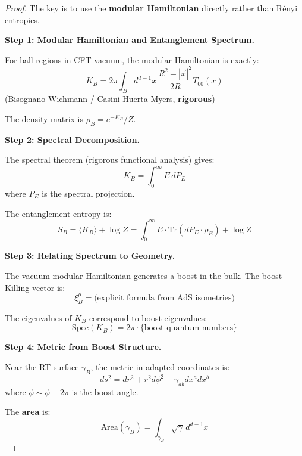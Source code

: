 \documentclass[12pt,a4paper]{article}
\begin{document}
\begin{proof}
The key is to use the \textbf{modular Hamiltonian} directly rather than R\'enyi entropies.

\textbf{Step 1: Modular Hamiltonian and Entanglement Spectrum.}

For ball regions in CFT vacuum, the modular Hamiltonian is exactly:
\begin{equation}
K_B = 2\pi \int_B d^{d-1}x \, \frac{R^2 - |\vec{x}|^2}{2R} T_{00}(x)
\end{equation}
(Bisognano-Wichmann / Casini-Huerta-Myers, \textbf{rigorous})

The density matrix is $\rho_B = e^{-K_B}/Z$.

\textbf{Step 2: Spectral Decomposition.}

The spectral theorem (rigorous functional analysis) gives:
\begin{equation}
K_B = \int_0^\infty E \, dP_E
\end{equation}
where $P_E$ is the spectral projection.

The entanglement entropy is:
\begin{equation}
S_B = \langle K_B \rangle + \log Z = \int_0^\infty E \cdot \text{Tr}(dP_E \cdot \rho_B) + \log Z
\end{equation}

\textbf{Step 3: Relating Spectrum to Geometry.}

The vacuum modular Hamiltonian generates a boost in the bulk. The boost Killing vector is:
\begin{equation}
\xi^\mu_B = \text{(explicit formula from AdS isometries)}
\end{equation}

The eigenvalues of $K_B$ correspond to boost eigenvalues:
\begin{equation}
\text{Spec}(K_B) = 2\pi \cdot \{\text{boost quantum numbers}\}
\end{equation}

\textbf{Step 4: Metric from Boost Structure.}

Near the RT surface $\gamma_B$, the metric in adapted coordinates is:
\begin{equation}
ds^2 = dr^2 + r^2 d\phi^2 + \gamma_{ab}dx^a dx^b
\end{equation}
where $\phi \sim \phi + 2\pi$ is the boost angle.

The \textbf{area} is:
\begin{equation}
\text{Area}(\gamma_B) = \int_{\gamma_B} \sqrt{\gamma} \, d^{d-1}x
\end{equation}


\end{proof}
\end{document}
